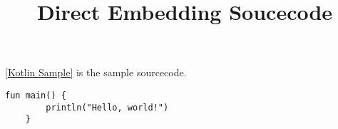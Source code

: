 \documentclass[a4paper,11pt,oneside,openany,report]{jsbook}
\title{Direct Embedding Soucecode}
\begin{document}
\maketitle
\ref{Kotlin Sample}
is the sample sourcecode.
\begin{lstlisting}[caption=Kotlin Sample,label=Kotlin Sample]
	fun main() {
		println("Hello, world!")
	}
\end{lstlisting}
\end{document}
